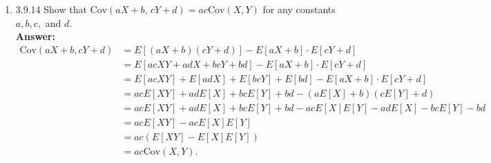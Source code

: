 \documentclass{article}
\begin{document}
\begin{enumerate}
        \item 3.9.14 Show that $\mathrm{Cov}(aX+b, \, cY+d) = ac\mathrm{Cov}(X,Y)$ for any constants $a,b,c,$ and $d$.\\
        \textbf{Answer: }
            \begin{align*}
                \mathrm{Cov}(aX+b,cY+d) &= E[(aX+b)(cY+d)]-E[aX+b] \cdot E[cY+d]\\
                &= E[acXY+adX+bcY+bd] -E[aX+b] \cdot E[cY+d]\\
                &= E[acXY] + E[adX] + E[bcY] + E[bd] -E[aX+b] \cdot E[cY+d]\\
                &= acE[XY]+adE[X]+bcE[Y]+bd-(aE[X]+b)(cE[Y]+d)\\
                &= acE[XY]+adE[X]+bcE[Y]+bd-acE[X]E[Y]-adE[X]-bcE[Y]-bd\\
                &= acE[XY]-acE[X]E[Y]\\
                &= ac(E[XY]-E[X]E[Y])\\
                &= ac\mathrm{Cov}(X,Y).    
            \end{align*}
        

\end{enumerate}
\end{document}
